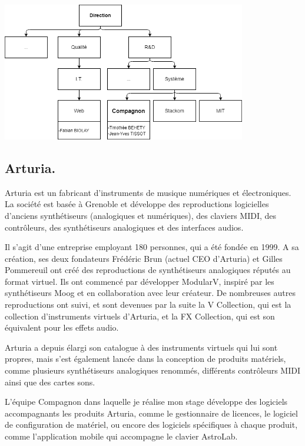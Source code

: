 \documentclass[francais]{rapportPFE}  %
\begin{document}
\begin{center}
	\centering
	\includegraphics[width=0.8\textwidth]{graphics/organigramme.png}
	\begin{tiny}
	\end{tiny}
	\label{fig}
\end{center}


\subsection{Arturia.}

Arturia est un fabricant d'instruments de musique numériques et électroniques. La société est basée à Grenoble et développe des reproductions logicielles d'anciens synthétiseurs (analogiques et numériques), des claviers MIDI, des contrôleurs, des synthétiseurs analogiques et des interfaces audios. 

Il s'agit d'une entreprise employant 180 personnes, qui a été fondée en 1999. A sa création, ses deux fondateurs Frédéric Brun (actuel CEO d'Arturia) et Gilles Pommereuil ont créé des reproductions de synthétiseurs analogiques réputés au format virtuel. Ils ont commencé par développer ModularV, inspiré par les synthétiseurs Moog et en collaboration avec leur créateur. De nombreuses autres reproductions ont suivi, et sont devenues par la suite la V Collection, qui est la collection d'instruments virtuels d'Arturia, et la FX Collection, qui est son équivalent pour les effets audio.

Arturia a depuis élargi son catalogue à des instruments virtuels qui lui sont propres, mais s'est également lancée dans la conception de produits matériels, comme plusieurs synthétiseurs analogiques renommés, différents contrôleurs MIDI ainsi que des cartes sons. 

L'équipe Compagnon dans laquelle je réalise mon stage développe des logiciels accompagnants les produits Arturia, comme le gestionnaire de licences, le logiciel de configuration de matériel, ou encore des logiciels spécifiques à chaque produit, comme l'application mobile qui accompagne le clavier AstroLab. 
\end{document}
